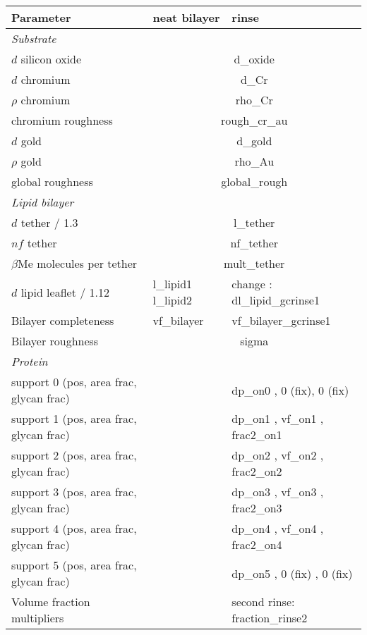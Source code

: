 \documentclass[11pt]{article}
\begin{document}
\renewcommand{\arraystretch}{1.1}

\begin{tabular}[t]{|p{6.5cm}|p{2.6cm}|p{5.0cm}|} \hline
\bf{Parameter} & \bf{neat bilayer} & \bf{rinse}  \\ \hline
\multicolumn{3}{|l|}{\textit{Substrate}} \\ \hline
$d$ silicon oxide &\multicolumn{2}{|c|}{ d\_oxide } \\ \hline
$d$ chromium &\multicolumn{2}{|c|}{ d\_Cr } \\ \hline
$\rho$ chromium &\multicolumn{2}{|c|}{ rho\_Cr } \\ \hline
chromium roughness &\multicolumn{2}{|c|}{ rough\_cr\_au } \\ \hline
$d$ gold &\multicolumn{2}{|c|}{ d\_gold } \\ \hline
$\rho$ gold &\multicolumn{2}{|c|}{ rho\_Au } \\ \hline
global roughness &\multicolumn{2}{|c|}{ global\_rough } \\ \hline

\multicolumn{3}{|l|}{\textit{Lipid bilayer}} \\ \hline
$d$ tether / 1.3 &\multicolumn{2}{|c|}{ l\_tether } \\ \hline
$nf$ tether &\multicolumn{2}{|c|}{ nf\_tether } \\ \hline
$\beta$Me molecules per tether &\multicolumn{2}{|c|}{ mult\_tether } \\ \hline
$d$ lipid leaflet / 1.12 & l\_lipid1 l\_lipid2 & change :  dl\_lipid\_gcrinse1   \\ \hline
Bilayer completeness &  vf\_bilayer & vf\_bilayer\_gcrinse1 \\ \hline
Bilayer roughness &\multicolumn{2}{|c|}{ sigma } \\ \hline

\multicolumn{3}{|l|}{\textit{Protein}} \\ \hline
support 0 (pos, area frac, glycan frac) & & dp\_on0 , 0 (fix), 0 (fix)   \\ \hline
support 1 (pos, area frac, glycan frac)  & & dp\_on1 , vf\_on1 , frac2\_on1   \\ \hline
support 2 (pos, area frac, glycan frac)  & & dp\_on2 , vf\_on2 , frac2\_on2   \\ \hline
support 3 (pos, area frac, glycan frac)  & & dp\_on3 , vf\_on3 , frac2\_on3   \\ \hline
support 4 (pos, area frac, glycan frac)  & & dp\_on4 , vf\_on4 , frac2\_on4   \\ \hline
support 5 (pos, area frac, glycan frac)  & & dp\_on5 , 0 (fix) , 0 (fix)   \\ \hline
Volume fraction multipliers & & second rinse: fraction\_rinse2   \\ \hline
\end{tabular}
\end{document}
